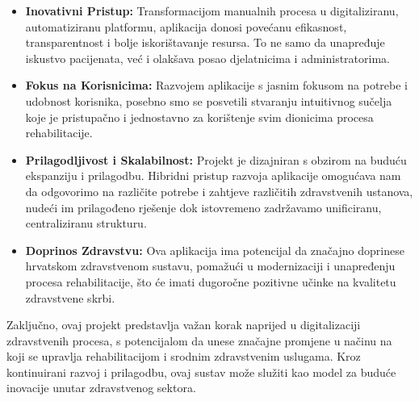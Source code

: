        \begin{itemize}
            \item \textbf{Inovativni Pristup:} Transformacijom manualnih procesa u digitaliziranu, automatiziranu platformu, aplikacija donosi povećanu efikasnost, transparentnost i bolje iskorištavanje resursa. To ne samo da unapređuje iskustvo pacijenata, već i olakšava posao djelatnicima i administratorima.
            
            \item \textbf{Fokus na Korisnicima:} Razvojem aplikacije s jasnim fokusom na potrebe i udobnost korisnika, posebno smo se posvetili stvaranju intuitivnog sučelja koje je pristupačno i jednostavno za korištenje svim dionicima procesa rehabilitacije.
        
            \item \textbf{Prilagodljivost i Skalabilnost:} Projekt je dizajniran s obzirom na buduću ekspanziju i prilagodbu. Hibridni pristup razvoja aplikacije omogućava nam da odgovorimo na različite potrebe i zahtjeve različitih zdravstvenih ustanova, nudeći im prilagođeno rješenje dok istovremeno zadržavamo unificiranu, centraliziranu strukturu.
        
            \item \textbf{Doprinos Zdravstvu:} Ova aplikacija ima potencijal da značajno doprinese hrvatskom zdravstvenom sustavu, pomažući u modernizaciji i unapređenju procesa rehabilitacije, što će imati dugoročne pozitivne učinke na kvalitetu zdravstvene skrbi.
        \end{itemize}
        
        Zaključno, ovaj projekt predstavlja važan korak naprijed u digitalizaciji zdravstvenih procesa, s potencijalom da unese značajne promjene u načinu na koji se upravlja rehabilitacijom i srodnim zdravstvenim uslugama. Kroz kontinuirani razvoj i prilagodbu, ovaj sustav može služiti kao model za buduće inovacije unutar zdravstvenog sektora.
        
		
		\eject
		
	